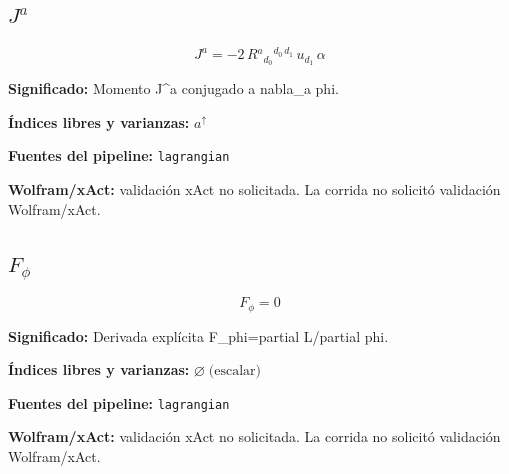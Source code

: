 \documentclass[11pt]{article}
\begin{document}
\subsection*{$ J^a $}
\begin{dmath*}[breakdepth={5}]
J^a = -2\,R{}^{a}{}_{d_{0}}{}^{d_{0}\,d_{1}}\,u{}_{d_{1}}\,\alpha
\end{dmath*}
\par\vspace{1.2\baselineskip}\noindent
\begin{minipage}{\linewidth}
\textbf{Significado:} Momento J^a conjugado a nabla\_a phi.\par
\textbf{Índices libres y varianzas:} $ a^{\uparrow} $\par
\textbf{Fuentes del pipeline:} \texttt{lagrangian}\par
\textbf{Wolfram/xAct:} validación xAct no solicitada. La corrida no solicitó validación Wolfram/xAct.\par
\end{minipage}
\subsection*{$ F_{\phi} $}
\begin{dmath*}[breakdepth={5}]
F_{\phi} = 0
\end{dmath*}
\par\vspace{1.2\baselineskip}\noindent
\begin{minipage}{\linewidth}
\textbf{Significado:} Derivada explícita F\_phi=partial L/partial phi.\par
\textbf{Índices libres y varianzas:} $ \varnothing\;\text{(escalar)} $\par
\textbf{Fuentes del pipeline:} \texttt{lagrangian}\par
\textbf{Wolfram/xAct:} validación xAct no solicitada. La corrida no solicitó validación Wolfram/xAct.\par
\end{minipage}
\end{document}
